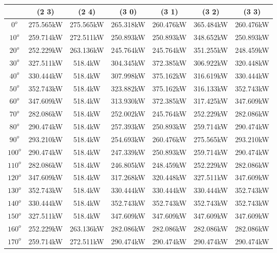         \begin{table}[H]
        	\centering
        	\begin{tabular}{|c|c|c|c|c|c|c|} \hline
        			& (2 3)		& (2 4)		& (3 0)		& (3 1)		& (3 2)		& (3 3)		\\ \hline
		$0^o$	& 275.565kW	& 275.565kW	& 265.318kW	& 260.476kW	& 365.484kW	& 260.476kW	\\ \hline
		$10^o$	& 259.714kW	& 272.511kW	& 250.893kW	& 250.893kW	& 348.652kW	& 250.893kW	\\ \hline
		$20^o$	& 252.229kW	& 263.136kW	& 245.764kW	& 245.764kW	& 351.255kW	& 248.459kW	\\ \hline
		$30^o$	& 327.511kW	& 518.4kW	& 304.345kW	& 372.385kW	& 306.922kW	& 320.448kW	\\ \hline
		$40^o$	& 330.444kW	& 518.4kW	& 307.998kW	& 375.162kW	& 316.619kW	& 330.444kW	\\ \hline
		$50^o$	& 352.743kW	& 518.4kW	& 323.882kW	& 375.162kW	& 316.133kW	& 352.743kW	\\ \hline
		$60^o$	& 347.609kW	& 518.4kW	& 313.930kW	& 372.385kW	& 317.425kW	& 347.609kW	\\ \hline
		$70^o$	& 282.086kW	& 518.4kW	& 252.002kW	& 245.764kW	& 252.229kW	& 282.086kW	\\ \hline
		$80^o$	& 290.474kW	& 518.4kW	& 257.393kW	& 250.893kW	& 259.714kW	& 290.474kW	\\ \hline
		$90^o$	& 293.210kW	& 518.4kW	& 254.693kW	& 260.476kW	& 275.565kW	& 293.210kW	\\ \hline
		$100^o$	& 290.474kW	& 518.4kW	& 247.339kW	& 250.893kW	& 259.714kW	& 290.474kW	\\ \hline
		$110^o$	& 282.086kW	& 518.4kW	& 246.805kW	& 248.459kW	& 252.229kW	& 282.086kW	\\ \hline
		$120^o$	& 347.609kW	& 518.4kW	& 317.268kW	& 320.448kW	& 327.511kW	& 347.609kW	\\ \hline
		$130^o$	& 352.743kW	& 518.4kW	& 330.444kW	& 330.444kW	& 330.444kW	& 352.743kW	\\ \hline
		$140^o$	& 330.444kW	& 518.4kW	& 352.743kW	& 352.743kW	& 352.743kW	& 352.743kW	\\ \hline
		$150^o$	& 327.511kW	& 518.4kW	& 347.609kW	& 347.609kW	& 347.609kW	& 347.609kW	\\ \hline
		$160^o$	& 252.229kW	& 263.136kW	& 282.086kW	& 282.086kW	& 282.086kW	& 282.086kW	\\ \hline
		$170^o$	& 259.714kW	& 272.511kW	& 290.474kW	& 290.474kW	& 290.474kW	& 290.474kW	\\ \hline

\end{tabular}
\end{table}
